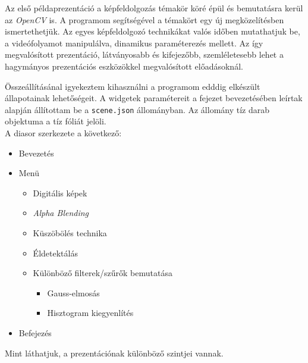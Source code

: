 
Az első példaprezentáció a képfeldolgozás témakör köré épül és bemutatásra kerül az \textit{OpenCV} is. A programom segítségével a témakört egy új megközelítésben ismertethetjük. Az egyes képfeldolgozó technikákat valós időben mutathatjuk be, a videófolyamot manipulálva, dinamikus paraméterezés mellett. Az így megvalósított prezentáció, látványosabb és kifejezőbb, szemléletesebb lehet a hagymányos prezentációs eszközökkel megvalósított előadásoknál.

Összeállításánal igyekeztem kihasználni a programom edddig elkészült állapotainak lehetőségeit. A widgetek paramétereit a fejezet bevezetésében leírtak alapján állítottam be a \texttt{scene.json} állományban. Az állomány tíz darab objektuma a tíz fóliát jelöli.\\
A diasor szerkezete a következő:
\begin{itemize}
	\item Bevezetés
	\item Menü
		\begin{itemize}
			\item Digitális képek
			\item \textit{Alpha Blending}
			\item Küszöbölés technika
			\item Éldetektálás
			\item Különböző filterek/szűrők bemutatása
				\begin{itemize}
					\item Gauss-elmosás
					\item Hisztogram kiegyenlítés
				\end{itemize}
		\end{itemize}
	\item Befejezés
\end{itemize}
Mint láthatjuk, a prezentációnak különböző szintjei vannak.

